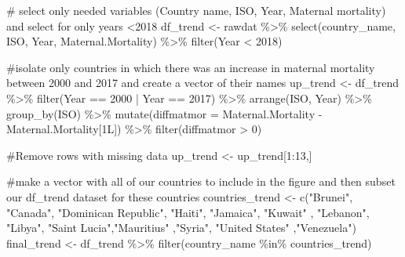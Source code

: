 \documentclass[
  letterpaper,
  DIV=11,
  numbers=noendperiod]{scrartcl}
\newenvironment{Shaded}{\begin{snugshade}}{\end{snugshade}}
\newcommand{\AttributeTok}[1]{\textcolor[rgb]{0.40,0.45,0.13}{#1}}
\newcommand{\CommentTok}[1]{\textcolor[rgb]{0.37,0.37,0.37}{#1}}
\newcommand{\DecValTok}[1]{\textcolor[rgb]{0.68,0.00,0.00}{#1}}
\newcommand{\FunctionTok}[1]{\textcolor[rgb]{0.28,0.35,0.67}{#1}}
\newcommand{\NormalTok}[1]{\textcolor[rgb]{0.00,0.23,0.31}{#1}}
\newcommand{\OtherTok}[1]{\textcolor[rgb]{0.00,0.23,0.31}{#1}}
\newcommand{\SpecialCharTok}[1]{\textcolor[rgb]{0.37,0.37,0.37}{#1}}
\newcommand{\StringTok}[1]{\textcolor[rgb]{0.13,0.47,0.30}{#1}}
\begin{document}
\begin{Shaded}
\begin{Highlighting}[]
\CommentTok{\# select only needed variables (Country name, ISO, Year, Maternal mortality) and select for only years \textless{}2018}
\NormalTok{df\_trend }\OtherTok{\textless{}{-}}\NormalTok{ rawdat }\SpecialCharTok{\%\textgreater{}\%} \FunctionTok{select}\NormalTok{(country\_name, ISO, Year, Maternal.Mortality) }\SpecialCharTok{\%\textgreater{}\%} 
  \FunctionTok{filter}\NormalTok{(Year }\SpecialCharTok{\textless{}} \DecValTok{2018}\NormalTok{)}

\CommentTok{\#isolate only countries in which there was an increase in maternal mortality between 2000 and 2017 and create a vector of their names}
\NormalTok{up\_trend }\OtherTok{\textless{}{-}}\NormalTok{ df\_trend }\SpecialCharTok{\%\textgreater{}\%} 
  \FunctionTok{filter}\NormalTok{(Year }\SpecialCharTok{==} \DecValTok{2000} \SpecialCharTok{|}\NormalTok{ Year }\SpecialCharTok{==} \DecValTok{2017}\NormalTok{) }\SpecialCharTok{\%\textgreater{}\%} 
  \FunctionTok{arrange}\NormalTok{(ISO, Year) }\SpecialCharTok{\%\textgreater{}\%} 
  \FunctionTok{group\_by}\NormalTok{(ISO) }\SpecialCharTok{\%\textgreater{}\%} 
  \FunctionTok{mutate}\NormalTok{(}\AttributeTok{diffmatmor =}\NormalTok{ Maternal.Mortality }\SpecialCharTok{{-}}\NormalTok{ Maternal.Mortality[}\DecValTok{1}\NormalTok{L]) }\SpecialCharTok{\%\textgreater{}\%} 
  \FunctionTok{filter}\NormalTok{(diffmatmor }\SpecialCharTok{\textgreater{}} \DecValTok{0}\NormalTok{)}

\CommentTok{\#Remove rows with missing data}
\NormalTok{up\_trend }\OtherTok{\textless{}{-}}\NormalTok{ up\_trend[}\DecValTok{1}\SpecialCharTok{:}\DecValTok{13}\NormalTok{,]}

\CommentTok{\#make a vector with all of our countries to include in the figure and then subset our df\_trend dataset for these countries}
\NormalTok{countries\_trend }\OtherTok{\textless{}{-}} \FunctionTok{c}\NormalTok{(}\StringTok{"Brunei"}\NormalTok{, }\StringTok{"Canada"}\NormalTok{, }\StringTok{"Dominican Republic"}\NormalTok{, }\StringTok{"Haiti"}\NormalTok{, }
                    \StringTok{"Jamaica"}\NormalTok{, }\StringTok{"Kuwait"}            
\NormalTok{                    , }\StringTok{"Lebanon"}\NormalTok{, }\StringTok{"Libya"}\NormalTok{,             }
                    \StringTok{"Saint Lucia"}\NormalTok{,}\StringTok{"Mauritius"}         
\NormalTok{                    ,}\StringTok{"Syria"}\NormalTok{, }\StringTok{"United States"}     
\NormalTok{                      ,}\StringTok{"Venezuela"}\NormalTok{)}
\NormalTok{final\_trend }\OtherTok{\textless{}{-}}\NormalTok{ df\_trend }\SpecialCharTok{\%\textgreater{}\%} \FunctionTok{filter}\NormalTok{(country\_name }\SpecialCharTok{\%in\%}\NormalTok{ countries\_trend)}


\end{Highlighting}
\end{Shaded}
\end{document}
